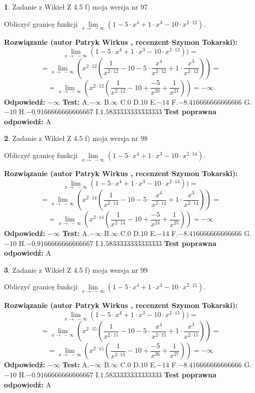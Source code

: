 \documentclass[12pt, a4paper]{article}
\theoremstyle{definition} %
\newtheorem{zad}{}
\newcommand{\zadStart}[1]{\begin{zad}#1\newline}
\newcommand{\zadStop}{\end{zad}}
\newcommand{\rozwStart}[2]{\noindent \textbf{Rozwiązanie (autor #1 , recenzent #2): }\newline}
\newcommand{\rozwStop}{\newline}
\newcommand{\odpStart}{\noindent \textbf{Odpowiedź:}\newline}
\newcommand{\odpStop}{\newline}
\newcommand{\testStart}{\noindent \textbf{Test:}\newline}
\newcommand{\testStop}{\newline}
\newcommand{\kluczStart}{\noindent \textbf{Test poprawna odpowiedź:}\newline}
\newcommand{\kluczStop}{\newline}
\begin{document}
\zadStart{Zadanie z Wikieł Z 4.5 f) moja wersja nr 97}


Obliczyć granicę funkcji  $\lim\limits_{x\to\ -\infty}(1 - 5 \cdot x^{4}+1 \cdot x^{3}- 10 \cdot x^{2\cdot12})$.
\zadStop
\rozwStart{Patryk Wirkus}{Szymon Tokarski}
$$\lim\limits_{x\to\ -\infty}(1 - 5 \cdot x^{4}+1 \cdot x^{3}- 10 \cdot x^{2\cdot12}))=$$
$$=\lim\limits_{x\to\ -\infty}(x^{2\cdot12}(\frac{1}{x^{2\cdot12}}-10 -5 \cdot \frac{x^{4}}{x^{2\cdot12}}+1 \cdot \frac{x^{3}}{x^{2\cdot12}}))=$$
$$=\lim\limits_{x\to\ -\infty}(x^{2\cdot12}(\frac{1}{x^{2\cdot12}}-10 + \frac{-5}{x^{20}}+ \frac{1}{x^{21}}))=-\infty$$
\rozwStop
\odpStart
$-\infty$
\odpStop
\testStart
A.$-\infty$ B.$\infty$ C.$0$ D.$10$ E.$-14$
F.$-8.416666666666666$ G.$-10$
H.$-0.9166666666666667$
I.$1.5833333333333333$
\testStop
\kluczStart
A
\kluczStop



\zadStart{Zadanie z Wikieł Z 4.5 f) moja wersja nr 98}


Obliczyć granicę funkcji  $\lim\limits_{x\to\ -\infty}(1 - 5 \cdot x^{4}+1 \cdot x^{3}- 10 \cdot x^{2\cdot14})$.
\zadStop
\rozwStart{Patryk Wirkus}{Szymon Tokarski}
$$\lim\limits_{x\to\ -\infty}(1 - 5 \cdot x^{4}+1 \cdot x^{3}- 10 \cdot x^{2\cdot14}))=$$
$$=\lim\limits_{x\to\ -\infty}(x^{2\cdot14}(\frac{1}{x^{2\cdot14}}-10 -5 \cdot \frac{x^{4}}{x^{2\cdot14}}+1 \cdot \frac{x^{3}}{x^{2\cdot14}}))=$$
$$=\lim\limits_{x\to\ -\infty}(x^{2\cdot14}(\frac{1}{x^{2\cdot14}}-10 + \frac{-5}{x^{24}}+ \frac{1}{x^{25}}))=-\infty$$
\rozwStop
\odpStart
$-\infty$
\odpStop
\testStart
A.$-\infty$ B.$\infty$ C.$0$ D.$10$ E.$-14$
F.$-8.416666666666666$ G.$-10$
H.$-0.9166666666666667$
I.$1.5833333333333333$
\testStop
\kluczStart
A
\kluczStop



\zadStart{Zadanie z Wikieł Z 4.5 f) moja wersja nr 99}


Obliczyć granicę funkcji  $\lim\limits_{x\to\ -\infty}(1 - 5 \cdot x^{4}+1 \cdot x^{3}- 10 \cdot x^{2\cdot15})$.
\zadStop
\rozwStart{Patryk Wirkus}{Szymon Tokarski}
$$\lim\limits_{x\to\ -\infty}(1 - 5 \cdot x^{4}+1 \cdot x^{3}- 10 \cdot x^{2\cdot15}))=$$
$$=\lim\limits_{x\to\ -\infty}(x^{2\cdot15}(\frac{1}{x^{2\cdot15}}-10 -5 \cdot \frac{x^{4}}{x^{2\cdot15}}+1 \cdot \frac{x^{3}}{x^{2\cdot15}}))=$$
$$=\lim\limits_{x\to\ -\infty}(x^{2\cdot15}(\frac{1}{x^{2\cdot15}}-10 + \frac{-5}{x^{26}}+ \frac{1}{x^{27}}))=-\infty$$
\rozwStop
\odpStart
$-\infty$
\odpStop
\testStart
A.$-\infty$ B.$\infty$ C.$0$ D.$10$ E.$-14$
F.$-8.416666666666666$ G.$-10$
H.$-0.9166666666666667$
I.$1.5833333333333333$
\testStop
\kluczStart
A
\kluczStop
\end{document}
